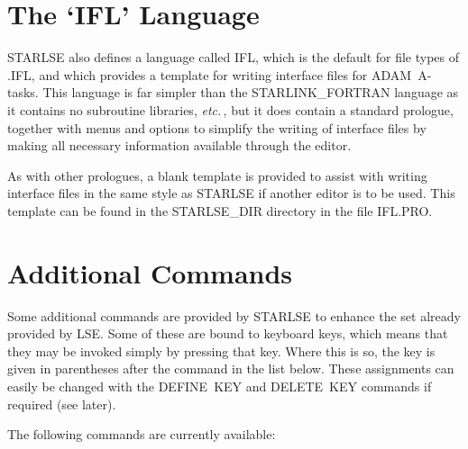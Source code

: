 \section{The `IFL' Language}

STARLSE also defines a language called IFL, which is the default for file
types of \mbox{.IFL}, and which provides a template for writing interface
files for \mbox{ADAM}~\mbox{A-tasks}. 
This language is far simpler than the STARLINK\_FORTRAN language as it
contains no subroutine libraries, {\em etc.}\,, but it does contain a standard
prologue, together with menus and options to simplify the writing of
interface files by making all necessary information available through the
editor. 

As with other prologues, a blank template is provided to assist with
writing interface files in the same style as \mbox{STARLSE} if another 
editor is to be used.
This template can be found in the \mbox{STARLSE\_DIR} directory in the file
\mbox{IFL.PRO}. 

\section{Additional Commands}
\label{sect:additionalcommands}

Some additional commands are provided by STARLSE to enhance the set already
provided by \mbox{LSE}. 
Some of these are bound to keyboard keys, which means that they may be 
invoked simply by pressing that key.
Where this is so, the key is given in parentheses after the command in the
list below. 
These assignments can easily be changed with the \mbox{DEFINE}~\mbox{KEY}
and \mbox{DELETE}~\mbox{KEY} commands if required (see later). 

The following commands are currently available:


